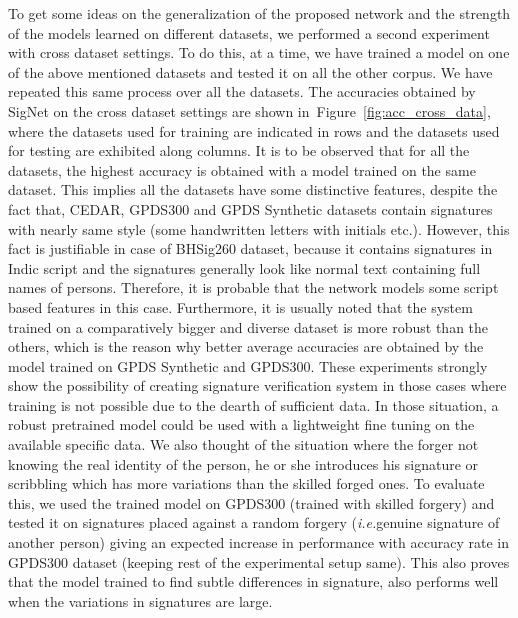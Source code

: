 \documentclass[times,twocolumn,final]{elsarticle}
\newcommand{\ie}{\textit{i.e.}}
\newcommand{\fig}[1]{Figure~\ref{#1}}
\begin{document}
To get some ideas on the generalization of the proposed network and the strength of the models learned on different datasets, we performed a second experiment with cross dataset settings. To do this, at a time, we have trained a model on one of the above mentioned datasets and tested it on all the other corpus. We have repeated this same process over all the datasets. The accuracies obtained by SigNet on the cross dataset settings are shown in~\fig{fig:acc_cross_data}, where the datasets used for training are indicated in rows and the datasets used for testing are exhibited along columns. It is to be observed that for all the datasets, the highest accuracy is obtained with a model trained on the same dataset. This implies all the datasets have some distinctive features, despite the fact that, CEDAR, GPDS300 and GPDS Synthetic datasets contain signatures with nearly same style (some handwritten letters with initials etc.). However, this fact is justifiable in case of BHSig260 dataset, because it contains signatures in Indic script and the signatures generally look like normal text containing full names of persons. Therefore, it is probable that the network models some script  based features in this case. Furthermore, it is usually noted that the system trained on a comparatively bigger and diverse dataset is more robust than the others, which is the reason why better average accuracies are obtained by the model trained on GPDS Synthetic and GPDS300. These experiments strongly show the possibility of creating signature verification system in those cases where training is not possible due to the dearth of sufficient data. In those situation, a robust pretrained model could be used with a lightweight fine tuning on the available specific data.
We also thought of the situation where the forger not knowing the real identity of the person, he or she introduces his signature or scribbling which has more variations than the skilled forged ones. To evaluate this, we used the trained model on GPDS300 (trained with skilled forgery) and tested it on signatures placed against a random forgery (\ie genuine signature of another person) giving an expected increase in performance with  accuracy rate in GPDS300 dataset (keeping rest of the experimental setup same). This also proves that the model trained to find subtle differences in signature, also performs well when the variations in signatures are large.


%
 
\end{document}
